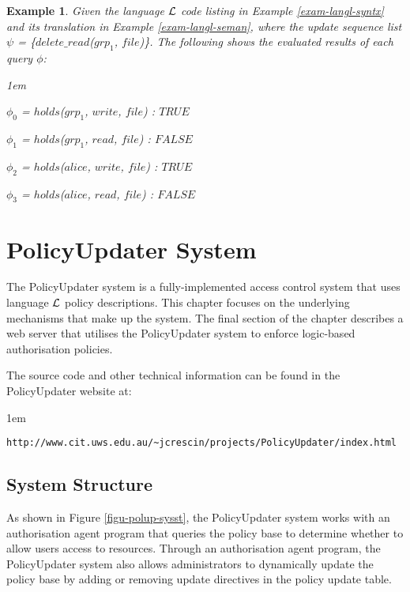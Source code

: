 \documentclass[11pt]{report}
\newtheorem{vexample}{Example}[chapter]
\newenvironment{vquote}
{
  \begin{list}{}{\leftmargin 1em}\item[]
}
{
  \end{list}
}
\begin{document}
      \begin{vexample}
        \label{exam-langl-evalu}
        Given the language ${\cal L}$ code listing in Example
        \ref{exam-langl-syntx} and its translation in Example
        \ref{exam-langl-seman}, where the update sequence list
        $\psi$ = \{$delete\_read$($grp_1$, $file$)\}. The following shows the
        evaluated results of each query $\phi$:

        \begin{vquote}
          $\phi_{0}$ = $holds$($grp_1$, $write$, $file$) : $TRUE$

          $\phi_{1}$ = $holds$($grp_1$, $read$, $file$) : $FALSE$

          $\phi_{2}$ = $holds$($alice$, $write$, $file$) : $TRUE$

          $\phi_{3}$ = $holds$($alice$, $read$, $file$) : $FALSE$
        \end{vquote}
      \end{vexample}

  \chapter{PolicyUpdater System}
    \label{chap-polup}

    The PolicyUpdater system is a fully-implemented access control system
    that uses language ${\cal L}$ policy descriptions. This chapter focuses
    on the underlying mechanisms that make up the system. The final section
    of the chapter describes a web server that utilises the PolicyUpdater
    system to enforce logic-based authorisation policies.

    The source code and other technical information can be found in the
    PolicyUpdater website at:

    \begin{vquote}
      {\tt\scriptsize http://www.cit.uws.edu.au/\~{}jcrescin/projects/PolicyUpdater/index.html}
    \end{vquote}

    \section{System Structure}
      \label{sect-polup-struc}

      As shown in Figure \ref{figu-polup-sysst}, the PolicyUpdater system
      works with an authorisation agent program that queries the policy base
      to determine whether to allow users access to resources. Through an
      authorisation agent program, the PolicyUpdater system also allows
      administrators to dynamically update the policy base by adding or
      removing update directives in the policy update table.
\end{document}

